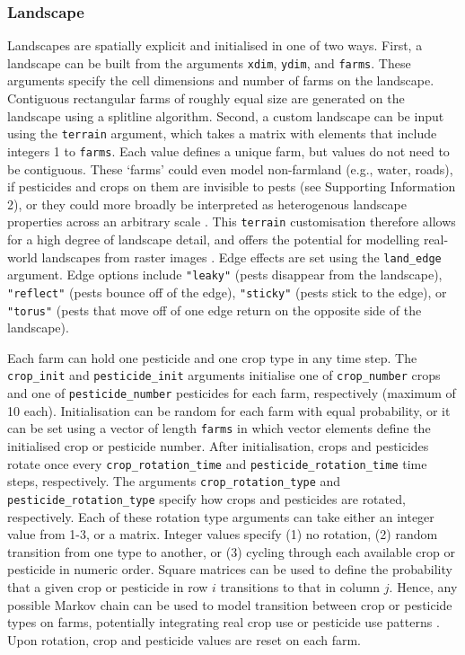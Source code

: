 \documentclass[
]{article}
\begin{document}
\hypertarget{landscape}{%
\subsubsection{Landscape}\label{landscape}}

Landscapes are spatially explicit and initialised in one of two ways.
First, a landscape can be built from the arguments \texttt{xdim}, \texttt{ydim}, and \texttt{farms}.
These arguments specify the cell dimensions and number of farms on the landscape.
Contiguous rectangular farms of roughly equal size are generated on the landscape using a splitline algorithm.
Second, a custom landscape can be input using the \texttt{terrain} argument, which takes a matrix with elements that include integers 1 to \texttt{farms}.
Each value defines a unique farm, but values do not need to be contiguous.
These `farms' could even model non-farmland (e.g., water, roads), if pesticides and crops on them are invisible to pests (see Supporting Information 2), or they could more broadly be interpreted as heterogenous landscape properties across an arbitrary scale \citep[e.g.,][]{Newman2023}.
This \texttt{terrain} customisation therefore allows for a high degree of landscape detail, and offers the potential for modelling real-world landscapes from raster images \citep[e.g.,][]{Millington2021}.
Edge effects are set using the \texttt{land\_edge} argument.
Edge options include \texttt{"leaky"} (pests disappear from the landscape), \texttt{"reflect"} (pests bounce off of the edge), \texttt{"sticky"} (pests stick to the edge), or \texttt{"torus"} (pests that move off of one edge return on the opposite side of the landscape).

Each farm can hold one pesticide and one crop type in any time step.
The \texttt{crop\_init} and \texttt{pesticide\_init} arguments initialise one of \texttt{crop\_number} crops and one of \texttt{pesticide\_number} pesticides for each farm, respectively (maximum of 10 each).
Initialisation can be random for each farm with equal probability, or it can be set using a vector of length \texttt{farms} in which vector elements define the initialised crop or pesticide number.
After initialisation, crops and pesticides rotate once every \texttt{crop\_rotation\_time} and \texttt{pesticide\_rotation\_time} time steps, respectively.
The arguments \texttt{crop\_rotation\_type} and \texttt{pesticide\_rotation\_type} specify how crops and pesticides are rotated, respectively.
Each of these rotation type arguments can take either an integer value from 1-3, or a matrix.
Integer values specify (1) no rotation, (2) random transition from one type to another, or (3) cycling through each available crop or pesticide in numeric order.
Square matrices can be used to define the probability that a given crop or pesticide in row \(i\) transitions to that in column \(j\).
Hence, any possible Markov chain can be used to model transition between crop or pesticide types on farms, potentially integrating real crop use or pesticide use patterns \citep{Zhang2020}.
Upon rotation, crop and pesticide values are reset on each farm.
\end{document}

